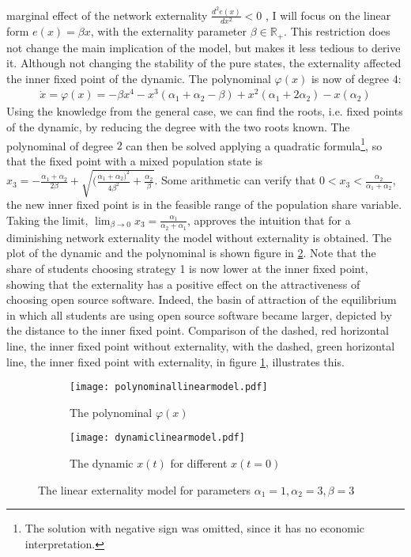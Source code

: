 \documentclass[11pt]{article}
\newcommand{\realnumb}{\mathbb{R}}
\begin{document}
marginal effect of the network externality $\frac{d^2e(x)}{dx^2} <0$ 
\parencite[73]{lin_impact_2008}, I will 
focus on the linear form $e(x) = \beta x$, with the externality parameter
$\beta \in \realnumb_+$. This restriction does not change the main implication
of the model, but makes it less tedious to derive it.
Although not changing the stability of the pure states, 
the externality affected the inner fixed point of the dynamic.
The polynominal $\varphi(x)$ is now of degree $4$:
\begin{align}
        \dot{x} = \varphi(x) = -\beta x^4 -x^3(\alpha_1 + \alpha_2 
        - \beta ) + x^2 (\alpha_1 + 2 \alpha_2) - x(\alpha_2)
\end{align}
Using the knowledge from the general case, we can find the roots, i.e. fixed
points of the dynamic, by reducing the degree with the two roots known. The
polynominal of degree $2$ can then be solved applying a quadratic formula\footnote{
The solution with negative sign was omitted, since it has no economic 
interpretation.}, so that the fixed point with a mixed population state is
$x_3 = -\frac{\alpha_1+\alpha_2}{2 \beta} + 
\sqrt{(\frac{\alpha_1+\alpha_2)^2}{4\beta^2} +\frac{\alpha_2}{\beta}}$. 
Some arithmetic can verify that $0<x_3<\frac{\alpha_2}{\alpha_1+\alpha_2}$, 
the new inner fixed point is in the feasible range of the population share 
variable.
Taking the limit, $\lim_{\beta \rightarrow 0} x_3 = 
\frac{\alpha_1}{\alpha_2+\alpha_1}$, approves the intuition that for a 
diminishing network externality the model without externality is obtained.
The plot of the dynamic and the polynominal is 
shown figure in \ref{fig:plotmodellinear}.
Note that the share of students choosing strategy 1 is now lower at the 
inner fixed point, showing that the externality has a positive 
effect on the attractiveness of choosing open source software. Indeed,
the basin of attraction of the equilibrium in which all students are using 
open source software became larger, depicted by the distance to the
inner fixed point.
Comparison of the dashed, red horizontal line, the inner fixed point without 
externality, with the dashed, green horizontal line, the inner fixed point 
with externality, in figure \ref{fig:dynamiclinear}, illustrates this. 
\begin{figure}[h]
        \centering
        \begin{subfigure}{.5\textwidth}
        \centering
        \texttt{[image: polynominallinearmodel.pdf]}
        \caption[Polynominal of the externality model]{The polynominal $\varphi(x)$} 
        \end{subfigure}%
        \begin{subfigure}{.5\textwidth}
        \centering
        \texttt{[image: dynamiclinearmodel.pdf]}
        \caption[Replicator dynamic of the model with externality]{The dynamic $x(t)$ for different $x(t=0)$} 
        \label{fig:dynamiclinear}
        \end{subfigure}%
        \caption[Polynominal and Dynamic of the model with externality]{The linear externality model for parameters $\alpha_1=1,\alpha_2=3,
        \beta=3$}
        \label{fig:plotmodellinear}
\end{figure}
\end{document}
